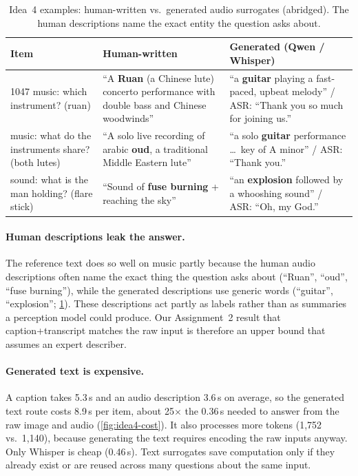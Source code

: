 \documentclass{article}
\begin{document}
\begin{table}[t]
\caption{Idea~4 examples: human-written vs.\ generated audio surrogates (abridged).
The human descriptions name the exact entity the question asks about.}
\label{tab:idea4-examples}
\centering\scriptsize
\setlength{\tabcolsep}{2.5pt}
\begin{tabular}{p{}p{}p{}}
\toprule
Item & Human-written & Generated (Qwen / Whisper) \\
\midrule
1047 music: which instrument? (ruan) & ``A \textbf{Ruan} (a Chinese lute) concerto performance with double bass and Chinese woodwinds'' & ``a \textbf{guitar} playing a fast-paced, upbeat melody'' / ASR: ``Thank you so much for joining us.'' \\
\addlinespace
1052 music: what do the instruments share? (both lutes) & ``A solo live recording of arabic \textbf{oud}, a traditional Middle Eastern lute'' & ``a solo \textbf{guitar} performance \ldots\ key of A minor'' / ASR: ``Thank you.'' \\
\addlinespace
895 sound: what is the man holding? (flare stick) & ``Sound of \textbf{fuse burning} + reaching the sky'' & ``an \textbf{explosion} followed by a whooshing sound'' / ASR: ``Oh, my God.'' \\
\bottomrule
\end{tabular}
\end{table}

\paragraph{Human descriptions leak the answer.} The reference text does so well on
music partly because the human audio descriptions often name the exact thing the
question asks about (``Ruan'', ``oud'', ``fuse burning''), while the generated
descriptions use generic words (``guitar'', ``explosion''; \cref{tab:idea4-examples}).
These descriptions act partly as labels rather than as summaries a perception model
could produce. Our Assignment~2 result that caption+transcript matches the raw input
is therefore an upper bound that assumes an expert describer.

\paragraph{Generated text is expensive.} A caption takes 5.3\,s and an audio
description 3.6\,s on average, so the generated text route costs 8.9\,s per item,
about 25$\times$ the 0.36\,s needed to answer from the raw image and audio
(\cref{fig:idea4-cost}). It also processes more tokens (1,752 vs.\ 1,140), because
generating the text requires encoding the raw inputs anyway. Only Whisper is cheap
(0.46\,s). Text surrogates save computation only if they already exist or are reused
across many questions about the same input.
\end{document}
